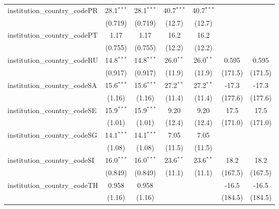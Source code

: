 \begin{tabular}{lcccccc}
   institution\_country\_codePR          & 28.1$^{***}$  & 28.1$^{***}$  & 40.7$^{***}$  & 40.7$^{***}$  &               &   \\   
                                         & (0.719)       & (0.719)       & (12.7)        & (12.7)        &               &   \\   
   institution\_country\_codePT          & 1.17          & 1.17          & 16.2          & 16.2          &               &   \\   
                                         & (0.755)       & (0.755)       & (12.2)        & (12.2)        &               &   \\   
   institution\_country\_codeRU          & 14.8$^{***}$  & 14.8$^{***}$  & 26.0$^{**}$   & 26.0$^{**}$   & 0.595         & 0.595\\   
                                         & (0.917)       & (0.917)       & (11.9)        & (11.9)        & (171.5)       & (171.5)\\   
   institution\_country\_codeSA          & 15.6$^{***}$  & 15.6$^{***}$  & 27.2$^{**}$   & 27.2$^{**}$   & -17.3         & -17.3\\   
                                         & (1.16)        & (1.16)        & (11.4)        & (11.4)        & (177.6)       & (177.6)\\   
   institution\_country\_codeSE          & 15.9$^{***}$  & 15.9$^{***}$  & 9.20          & 9.20          & 17.5          & 17.5\\   
                                         & (1.01)        & (1.01)        & (12.4)        & (12.4)        & (171.0)       & (171.0)\\   
   institution\_country\_codeSG          & 14.1$^{***}$  & 14.1$^{***}$  & 7.05          & 7.05          &               &   \\   
                                         & (1.08)        & (1.08)        & (11.5)        & (11.5)        &               &   \\   
   institution\_country\_codeSI          & 16.0$^{***}$  & 16.0$^{***}$  & 23.6$^{**}$   & 23.6$^{**}$   & 18.2          & 18.2\\   
                                         & (0.849)       & (0.849)       & (11.1)        & (11.1)        & (167.5)       & (167.5)\\   
   institution\_country\_codeTH          & 0.958         & 0.958         &               &               & -16.5         & -16.5\\   
                                         & (1.16)        & (1.16)        &               &               & (184.5)       & (184.5)\\   

\end{tabular}
